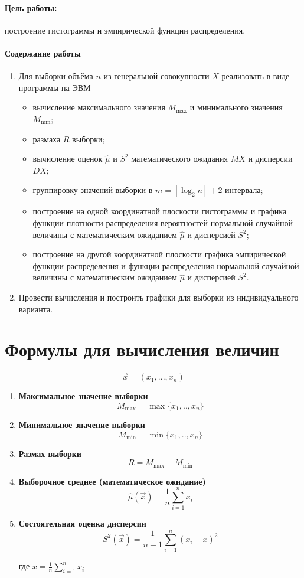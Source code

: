 \documentclass[a4paper,oneside,12pt]{extreport}
\theoremstyle{indented}
\begin{document}
\paragraph{Цель работы:} построение гистограммы и эмпирической функции распределения.

\paragraph{Содержание работы}

\begin{enumerate}
	\item Для выборки объёма $n$ из генеральной совокупности $X$ реализовать в виде программы на ЭВМ
	\begin{itemize}
		\item вычисление максимального значения $M_{\max}$ и минимального значения $M_{\min}$;
		\item размаха $R$ выборки;
		\item вычисление оценок $\hat\mu$ и $S^2$ математического ожидания $MX$ и дисперсии $DX$;
		\item группировку значений выборки в $m = [\log_2 n] + 2$ интервала;
		\item построение на одной координатной плоскости гистограммы и графика функции плотности распределения вероятностей нормальной случайной величины с математическим ожиданием $\hat{\mu}$ и дисперсией $S^2$;
		\item построение на другой координатной плоскости графика эмпирической функции распределения и функции распределения нормальной случайной величины с математическим ожиданием $\hat{\mu}$ и дисперсией $S^2$.
	\end{itemize}
	\item Провести вычисления и построить графики для выборки из индивидуального варианта.
\end{enumerate}

\pagebreak
\section{Формулы для вычисления величин}

$$\vec x=(x_1, ..., x_n)$$

\begin{enumerate}
\item \textbf{Максимальное значение выборки}
$$M_{\max} = \max\{x_1, .., x_n\}$$
\item \textbf{Минимальное значение выборки}
$$M_{\min} = \min\{x_1, .., x_n\}$$
\item \textbf{Размах выборки}
$$R = M_{\max} - M_{\min}$$
\item \textbf{Выборочное среднее (математическое ожидание)}
$$\hat \mu(\vec x) = \frac{1}{n} \sum_{i=1}^n x_i$$
\item \textbf{Состоятельная оценка дисперсии}
$$S^2 (\vec x) = \frac{1}{n-1} \sum_{i=1}^n (x_i - \overline x)^2$$

где $ \overline{x} = \frac{1}{n} \sum_{i=1}^n x_i$
\end{enumerate}
\end{document}
